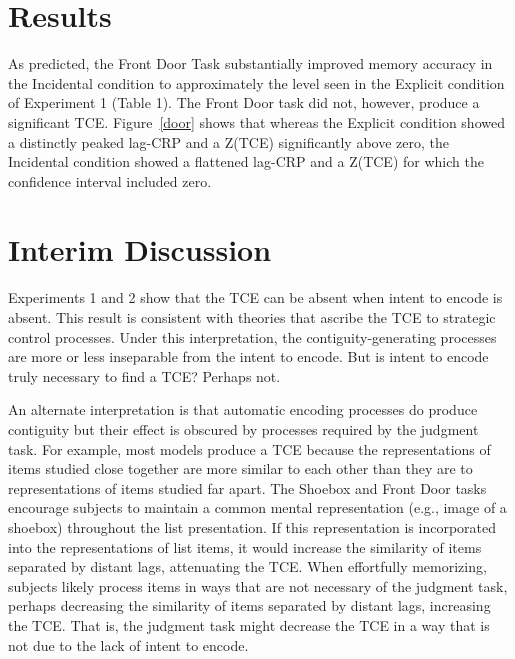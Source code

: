 \documentclass[jou,natbib,floatsintext]{apa6} %
\begin{document}
\section{Results}
As predicted, the Front Door Task substantially improved memory accuracy in the Incidental condition to approximately the level seen in the Explicit condition of Experiment 1 (Table 1). The Front Door task did not, however, produce a significant TCE. Figure~\ref{door} shows that whereas the Explicit condition showed a distinctly peaked lag-CRP and a Z(TCE) significantly above zero, the Incidental condition showed a flattened lag-CRP and a Z(TCE) for which the confidence interval included zero.

\begin{figure*}%
\caption{The temporal contiguity effect (TCE) with the Front Door size judgment task under explicit versus incidental encoding. \paneltext}
\label{door}
\end{figure*}

\section{Interim Discussion}
Experiments 1 and 2 show that the TCE can be absent when intent to encode is absent. This result is consistent with theories that ascribe the TCE to strategic control processes. Under this interpretation, the contiguity-generating processes are more or less inseparable from the intent to encode. But is intent to encode truly necessary to find a TCE? Perhaps not.

An alternate interpretation is that automatic encoding processes do produce contiguity but their effect is obscured by processes required by the judgment task. For example, most models produce a TCE because the representations of items studied close together are more similar to each other than they are to representations of items studied far apart. The Shoebox and Front Door tasks encourage subjects to maintain a common mental representation (e.g., image of a shoebox) throughout the list presentation. If this representation is incorporated into the representations of list items, it would increase the similarity of items separated by distant lags, attenuating the TCE. When effortfully memorizing, subjects likely process items in ways that are not necessary of the judgment task, perhaps decreasing the similarity of items separated by distant lags, increasing the TCE. That is, the judgment task might decrease the TCE in a way that is not due to the lack of intent to encode.
\end{document}
